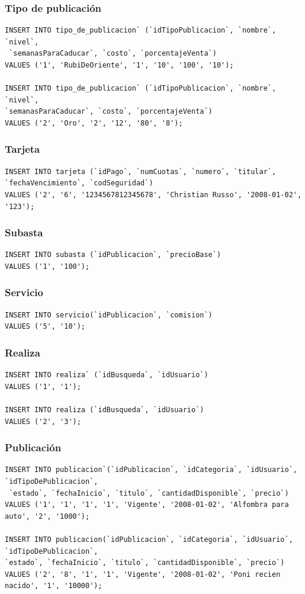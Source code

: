 \documentclass[a4paper, 10pt, twoside]{article}
\begin{document}
\subsubsection{Tipo de publicaci\'on}
\begin{verbatim}
INSERT INTO tipo_de_publicacion` (`idTipoPublicacion`, `nombre`, `nivel`,
 `semanasParaCaducar`, `costo`, `porcentajeVenta`) 
VALUES ('1', 'RubiDeOriente', '1', '10', '100', '10');

INSERT INTO tipo_de_publicacion` (`idTipoPublicacion`, `nombre`, `nivel`, 
`semanasParaCaducar`, `costo`, `porcentajeVenta`) 
VALUES ('2', 'Oro', '2', '12', '80', '8');
\end{verbatim}
\subsubsection{Tarjeta}
\begin{verbatim}
INSERT INTO tarjeta (`idPago`, `numCuotas`, `numero`, `titular`, `fechaVencimiento`, `codSeguridad`)
VALUES ('2', '6', '1234567812345678', 'Christian Russo', '2008-01-02', '123');
\end{verbatim}
\subsubsection{Subasta}
\begin{verbatim}
INSERT INTO subasta (`idPublicacion`, `precioBase`) 
VALUES ('1', '100');
\end{verbatim}
\subsubsection{Servicio}
\begin{verbatim}
INSERT INTO servicio(`idPublicacion`, `comision`) 
VALUES ('5', '10');
\end{verbatim}
\subsubsection{Realiza}
\begin{verbatim}
INSERT INTO realiza` (`idBusqueda`, `idUsuario`) 
VALUES ('1', '1');

INSERT INTO realiza (`idBusqueda`, `idUsuario`) 
VALUES ('2', '3');
\end{verbatim}
\subsubsection{Publicaci\'on}
\begin{verbatim}
INSERT INTO publicacion`(`idPublicacion`, `idCategoria`, `idUsuario`, `idTipoDePublicacion`,
 `estado`, `fechaInicio`, `titulo`, `cantidadDisponible`, `precio`) 
VALUES ('1', '1', '1', '1', 'Vigente', '2008-01-02', 'Alfombra para auto', '2', '1000');

INSERT INTO publicacion(`idPublicacion`, `idCategoria`, `idUsuario`, `idTipoDePublicacion`, 
`estado`, `fechaInicio`, `titulo`, `cantidadDisponible`, `precio`) 
VALUES ('2', '8', '1', '1', 'Vigente', '2008-01-02', 'Poni recien nacido', '1', '10000');
\end{verbatim}
\end{document}
